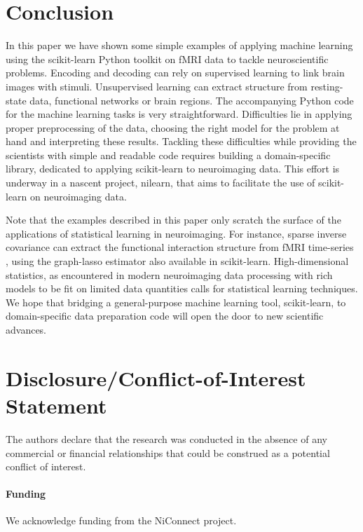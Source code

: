\documentclass{frontiersSCNS} %
\begin{document}
\section{Conclusion}

In this paper we have shown some simple examples of applying machine
learning using the scikit-learn Python toolkit on fMRI data to tackle
neuroscientific problems. Encoding and decoding can rely on supervised
learning to link brain images with stimuli. Unsupervised learning
can extract structure from resting-state data, functional networks or
brain regions. The accompanying Python code for the machine learning
tasks is very straightforward. Difficulties lie in applying proper 
preprocessing of the data, choosing the right model for the problem at
hand and interpreting these results. Tackling these difficulties while
providing the scientists with simple and readable code requires building
a domain-specific library, dedicated to applying scikit-learn to
neuroimaging data. This effort is underway in a nascent project, nilearn,
that aims to facilitate the use of scikit-learn on neuroimaging data.

Note that the examples described in this paper only scratch the
surface of the applications of statistical learning in neuroimaging. For
instance, sparse inverse covariance can extract the functional 
interaction structure from fMRI time-series \citep{varoquaux2013}, using
the graph-lasso estimator also available in scikit-learn.
High-dimensional statistics, as encountered in modern neuroimaging data
processing with rich models to be fit on limited data quantities calls
for statistical learning techniques. We hope that bridging a
general-purpose machine learning tool, scikit-learn, to domain-specific
data preparation code will open the door to new scientific advances.


\section*{Disclosure/Conflict-of-Interest Statement}
The authors declare that the research was conducted in the absence of any
commercial or financial relationships that could be construed as a potential
conflict of interest.

\paragraph{Funding\textcolon} We acknowledge funding from the NiConnect project.


\end{document}
